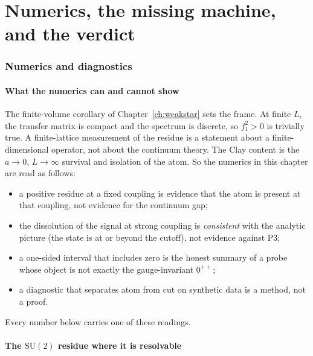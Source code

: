 \clearpage
\part{Numerics, the missing machine, and the verdict}
\section{Numerics and diagnostics}
\label{ch:numerics}

\subsection{What the numerics can and cannot show}

The finite-volume corollary of Chapter~\ref{ch:weakstar} sets the frame. At finite $L$, the
transfer matrix is compact and the spectrum is discrete, so $f_1^2>0$ is trivially true. A
finite-lattice measurement of the residue is a statement about a finite-dimensional operator, not
about the continuum theory. The Clay content is the $a\to0$, $L\to\infty$ survival and isolation
of the atom. So the numerics in this chapter are read as follows:
\begin{itemize}
\item a positive residue at a fixed coupling is \LE{} evidence that the atom is present at that
  coupling, not evidence for the continuum gap;
\item the dissolution of the signal at strong coupling is \emph{consistent} with the analytic
  picture (the state is at or beyond the cutoff), not evidence against P3;
\item a one-sided interval that includes zero is the honest summary of a probe whose object is
  not exactly the gauge-invariant $0^{++}$;
\item a diagnostic that separates atom from cut on synthetic data is a method, not a proof.
\end{itemize}
Every number below carries one of these readings.

\subsection{The $\mathrm{SU}(2)$ residue where it is resolvable}

